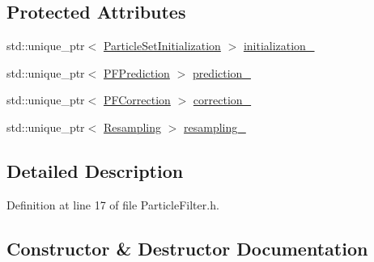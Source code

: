 \subsection*{Protected Attributes}
\begin{DoxyCompactItemize}
\item 
std\+::unique\+\_\+ptr$<$ \mbox{\hyperlink{classbfl_1_1ParticleSetInitialization}{Particle\+Set\+Initialization}} $>$ \mbox{\hyperlink{classbfl_1_1ParticleFilter_aeb2120d4b99b0abc79ec3c2109952322}{initialization\+\_\+}}
\item 
std\+::unique\+\_\+ptr$<$ \mbox{\hyperlink{classbfl_1_1PFPrediction}{P\+F\+Prediction}} $>$ \mbox{\hyperlink{classbfl_1_1ParticleFilter_ab86f707d29a823423fe35de37e8f9d8e}{prediction\+\_\+}}
\item 
std\+::unique\+\_\+ptr$<$ \mbox{\hyperlink{classbfl_1_1PFCorrection}{P\+F\+Correction}} $>$ \mbox{\hyperlink{classbfl_1_1ParticleFilter_a691428357c812ba009e995175778c173}{correction\+\_\+}}
\item 
std\+::unique\+\_\+ptr$<$ \mbox{\hyperlink{classbfl_1_1Resampling}{Resampling}} $>$ \mbox{\hyperlink{classbfl_1_1ParticleFilter_a9b0b855942fa4fb847443b10fe26c589}{resampling\+\_\+}}
\end{DoxyCompactItemize}


\subsection{Detailed Description}


Definition at line 17 of file Particle\+Filter.\+h.



\subsection{Constructor \& Destructor Documentation}
\mbox{\label{classbfl_1_1ParticleFilter_a849f01a7651c350438c31bf364ef59c3}} 
